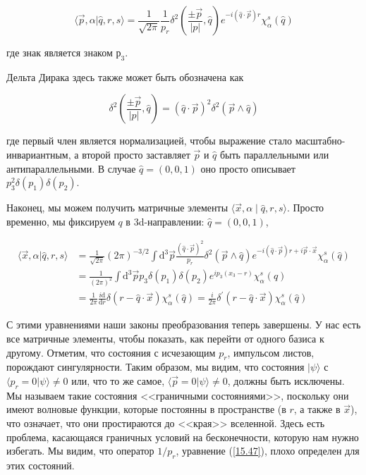 \documentclass[main.tex]{subfiles}
\begin{document}
\begin{equation}\label{15.81}
	\langle\vec{p}, \alpha | \hat{q}, r, s\rangle=\frac{1}{\sqrt{2 \pi}} \frac{1}{p_{r}} \delta^{2}\left(\frac{\pm \vec{p}}{|p|}, \hat{q}\right) e^{-i(\hat{q} \cdot \vec{p}) r} \chi_{\alpha}^{s}(\hat{q})
\end{equation}

      
где знак является знаком $р_3$.

Дельта Дирака здесь также может быть обозначена как

\begin{equation}\label{15.82}
	\delta^{2}\left(\frac{\pm \vec{p}}{|p|}, \hat{q}\right)=(\hat{q} \cdot \vec{p})^{2} \delta^{2}(\vec{p} \wedge \hat{q})
\end{equation}

где первый член является нормализацией, чтобы выражение стало масштабно-инвариантным, а второй просто заставляет $\vec p$ и $\hat q$ быть параллельными или антипараллельными. В случае $\hat q = (0,0, 1)$ оно просто описывает $p_3^2\delta(p_1)\delta(p_2)$.

Наконец, мы можем получить матричные элементы $\langle\vec x, \alpha\mid\hat q,r,s\rangle$. Просто временно, мы фиксируем $q$ в 3d-направлении: $\hat q = (0,0, 1)$,

\begin{equation}\label{15.83}
	\begin{aligned}
\langle\vec{x}, \alpha | \hat{q}, r, s\rangle &=\frac{1}{\sqrt{2 \pi}}(2 \pi)^{-3 / 2} \int \mathrm{d}^{3} \vec{p} \frac{(\hat{q} \cdot \vec{p})^{2}}{p_{r}} \delta^{2}(\vec{p} \wedge \hat{q}) e^{-i(\hat{q} \cdot \vec{p}) r+i \vec{p} \cdot \vec{x}} \chi_{\alpha}^{s}(\hat{q}) \\
&=\frac{1}{(2 \pi)^{2}} \int \mathrm{d}^{3} \vec{p} p_{3} \delta\left(p_{1}\right) \delta\left(p_{2}\right) e^{i p_{3}\left(x_{3}-r\right)} \chi_{\alpha}^{s}(\hat{q}) \\
&=\frac{1}{2 \pi} \frac{i \mathrm{d}}{\mathrm{d} r} \delta(r-\hat{q} \cdot \vec{x}) \chi_{\alpha}^{s}(\hat{q})=\frac{i}{2 \pi} \delta^{\prime}(r-\hat{q} \cdot \vec{x}) \chi_{\alpha}^{s}(\hat{q})
\end{aligned}
\end{equation}

С этими уравнениями наши законы преобразования теперь завершены. У нас есть все матричные элементы, чтобы показать, как перейти от одного базиса к другому. Отметим, что состояния с исчезающим $p_r$, импульсом листов, порождают сингулярности. Таким образом, мы видим, что состояния $|\psi\rangle$ с $\langle p_r = 0|\psi\rangle \neq 0$ или, что то же самое, $\langle \vec p = 0|\psi\rangle \neq 0$, должны быть исключены. Мы называем такие состояния <<граничными состояниями>>, поскольку они имеют волновые функции, которые постоянны в пространстве (в $r$, а также в $\vec x$), что означает, что они простираются до <<края>> вселенной. Здесь есть проблема, касающаяся граничных условий на бесконечности, которую нам нужно избегать. Мы видим, что оператор $1 / p_r$, уравнение (\ref{15.47}), плохо определен для этих состояний.
\end{document}
